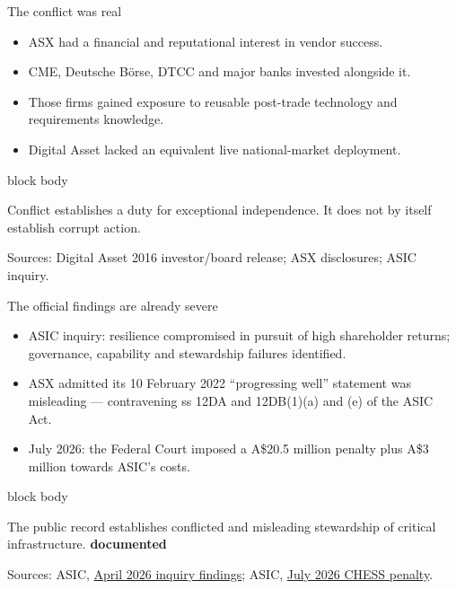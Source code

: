 \documentclass[aspectratio=169,12pt]{beamer}
\newcommand{\source}[1]{\vfill\par\fontsize{5.4}{6.5}\selectfont\color{Quiet}Sources: #1}
\newcommand{\tightitems}{\setlength{\itemsep}{0.42em}\setlength{\parskip}{0pt}}
\newcommand{\tdoc}{\textcolor{Sage}{\bfseries documented}}
\newenvironment{statement}{%
  \begin{beamercolorbox}[sep=.18cm,rounded=false,wd=\linewidth]{block body}%
  \fontsize{13}{15.5}\selectfont\bfseries
}{\end{beamercolorbox}}
\begin{document}
\begin{frame}{The conflict was real}
  \begin{itemize}\tightitems
    \item ASX had a financial and reputational interest in vendor success.
    \item CME, Deutsche B\"orse, DTCC and major banks invested alongside it.
    \item Those firms gained exposure to reusable post-trade technology and requirements knowledge.
    \item Digital Asset lacked an equivalent live national-market deployment.
  \end{itemize}
  \begin{statement}
    Conflict establishes a duty for exceptional independence. It does not by itself establish corrupt action.
  \end{statement}
  \source{Digital Asset 2016 investor/board release; ASX disclosures; ASIC inquiry.}
\end{frame}

\begin{frame}{The official findings are already severe}
  \begin{itemize}\tightitems
    \item ASIC inquiry: resilience compromised in pursuit of high shareholder returns; governance, capability and stewardship failures identified.
    \item ASX admitted its 10 February 2022 ``progressing well'' statement was misleading --- contravening ss 12DA and 12DB(1)(a) and (e) of the ASIC Act.
    \item July 2026: the Federal Court imposed a A\$20.5 million penalty plus A\$3 million towards ASIC's costs.
  \end{itemize}
  \begin{statement}
    The public record establishes conflicted and misleading stewardship of critical infrastructure. \hfill\tdoc
  \end{statement}
  \source{ASIC, \href{https://www.asic.gov.au/about-asic/news-centre/find-a-media-release/2026-releases/26-059mr-asic-publishes-asx-inquiry-panel-final-report-and-acknowledges-observations/}{April 2026 inquiry findings}; ASIC, \href{https://www.asic.gov.au/about-asic/news-centre/find-a-media-release/2026-releases/26-143mr-asx-ordered-to-pay-20-5-million-penalty-for-misleading-conduct-relating-to-chess-replacement-project/}{July 2026 CHESS penalty}.}
\end{frame}
\end{document}
